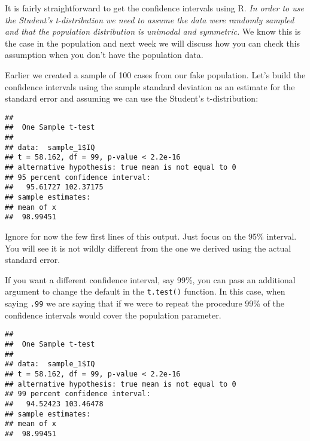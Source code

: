 \documentclass[
]{book}
\newenvironment{Shaded}{\begin{snugshade}}{\end{snugshade}}
\newcommand{\AttributeTok}[1]{\textcolor[rgb]{0.13,0.29,0.53}{#1}}
\newcommand{\DecValTok}[1]{\textcolor[rgb]{0.00,0.00,0.81}{#1}}
\newcommand{\FunctionTok}[1]{\textcolor[rgb]{0.13,0.29,0.53}{\textbf{#1}}}
\newcommand{\NormalTok}[1]{#1}
\newcommand{\SpecialCharTok}[1]{\textcolor[rgb]{0.81,0.36,0.00}{\textbf{#1}}}
\begin{document}
It is fairly straightforward to get the confidence intervals using R. \emph{In order to use the Student's t-distribution we need to assume the data were randomly sampled and that the population distribution is unimodal and symmetric.} We know this is the case in the population and next week we will discuss how you can check this assumption when you don't have the population data.

Earlier we created a sample of 100 cases from our fake population. Let's build the confidence intervals using the sample standard deviation as an estimate for the standard error and assuming we can use the Student's t-distribution:

\begin{Shaded}
\end{Shaded}

\begin{verbatim}
## 
##  One Sample t-test
## 
## data:  sample_1$IQ
## t = 58.162, df = 99, p-value < 2.2e-16
## alternative hypothesis: true mean is not equal to 0
## 95 percent confidence interval:
##   95.61727 102.37175
## sample estimates:
## mean of x 
##  98.99451
\end{verbatim}

Ignore for now the few first lines of this output. Just focus on the 95\% interval. You will see it is not wildly different from the one we derived using the actual standard error.

If you want a different confidence interval, say 99\%, you can pass an additional argument to change the default in the \texttt{t.test()} function. In this case, when saying \texttt{.99} we are saying that if we were to repeat the procedure 99\% of the confidence intervals would cover the population parameter.

\begin{Shaded}
\end{Shaded}

\begin{verbatim}
## 
##  One Sample t-test
## 
## data:  sample_1$IQ
## t = 58.162, df = 99, p-value < 2.2e-16
## alternative hypothesis: true mean is not equal to 0
## 99 percent confidence interval:
##   94.52423 103.46478
## sample estimates:
## mean of x 
##  98.99451
\end{verbatim}
\end{document}
